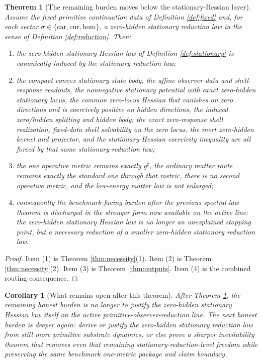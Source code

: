\documentclass[11pt]{article}
\newcommand{\CompletedMetric}{g^{\sharp}}
\newcommand{\Car}{\mathrm{car}}
\newcommand{\Cur}{\mathrm{cur}}
\newcommand{\Hom}{\mathrm{hom}}
\newtheorem{corollary}{Corollary}
\newtheorem{theorem}{Theorem}
\begin{document}
\begin{theorem}[The remaining burden moves below the stationary-Hessian layer]
\label{thm:main}
Assume the fixed primitive continuation data of Definition \ref{def:fixed} and, for each sector \(\sigma\in\{\Car,\Cur,\Hom\}\), a zero-hidden stationary reduction law in the sense of Definition \ref{def:reduction}. Then:
\begin{enumerate}
    \item the zero-hidden stationary Hessian law of Definition \ref{def:stationary} is canonically induced by the stationary-reduction law;
    \item the compact convex stationary state body, the affine observer-data and shell-response readouts, the nonnegative stationary potential with exact zero-hidden stationary locus, the common zero-locus Hessian that vanishes on zero directions and is coercively positive on hidden directions, the induced zero/hidden splitting and hidden body, the exact zero-response shell realization, fixed-data shell solvability on the zero locus, the inert zero-hidden kernel and projector, and the stationary-Hessian coercivity inequality are all forced by that same stationary-reduction law;
    \item the one operative metric remains exactly \(\CompletedMetric\), the ordinary matter route remains exactly the standard one through that metric, there is no second operative metric, and the low-energy matter law is not enlarged;
    \item consequently the benchmark-facing burden after the previous spectral-law theorem is discharged in the stronger form now available on the active line: the zero-hidden stationary Hessian law is no longer an unexplained stopping point, but a necessary reduction of a smaller zero-hidden stationary reduction law.
\end{enumerate}
\end{theorem}

\begin{proof}
Item (1) is Theorem \ref{thm:necessity}(1). Item (2) is Theorem \ref{thm:necessity}(2). Item (3) is Theorem \ref{thm:outputs}. Item (4) is the combined routing consequence.
\end{proof}

\begin{corollary}[What remains open after this theorem]
\label{cor:next}
After Theorem \ref{thm:main}, the remaining honest burden is no longer to justify the zero-hidden stationary Hessian law itself on the active primitive-observer-reduction line. The next honest burden is deeper again: derive or justify the zero-hidden stationary reduction law from still more primitive substrate dynamics, or else prove a sharper inevitability theorem that removes even that remaining stationary-reduction-level freedom while preserving the same benchmark one-metric package and claim boundary.
\end{corollary}
\end{document}
